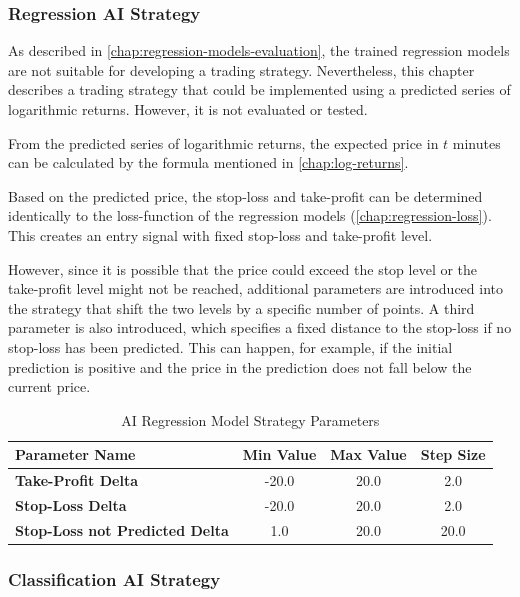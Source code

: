 \subsubsection{Regression AI Strategy}
\label{chap:regression-ai-stategy}

As described in \autoref{chap:regression-models-evaluation}, the trained regression models are not suitable for developing a trading strategy.
Nevertheless, this chapter describes a trading strategy that could be implemented using a predicted series of logarithmic returns.
However, it is not evaluated or tested.

From the predicted series of logarithmic returns, the expected price in $t$ minutes can be calculated by the formula mentioned in \autoref{chap:log-returns}.

Based on the predicted price, the stop-loss and take-profit can be determined identically to the loss-function of the regression models (\autoref{chap:regression-loss}).
This creates an entry signal with fixed stop-loss and take-profit level.

However, since it is possible that the price could exceed the stop level or the take-profit level might not be reached, additional parameters are introduced into the strategy that shift the two levels by a specific number of points.
A third parameter is also introduced, which specifies a fixed distance to the stop-loss if no stop-loss has been predicted.
This can happen, for example, if the initial prediction is positive and the price in the prediction does not fall below the current price.

\begin{table}[H]
    \centering
    \begin{tabular}{L{4cm}ccc}
        \toprule
        Parameter Name & Min Value & Max Value & Step Size
        \\
        \midrule
        \textbf{Take-Profit Delta}             & -20.0 & 20.0 & 2.0  \\
        \textbf{Stop-Loss Delta}               & -20.0 & 20.0 & 2.0  \\
        \textbf{Stop-Loss not Predicted Delta} & 1.0   & 20.0 & 20.0 \\
        \bottomrule
    \end{tabular}
    \caption{AI Regression Model Strategy Parameters}
    \label{tbl:regression-strategy-parameters}
\end{table}

\subsubsection{Classification AI Strategy}

